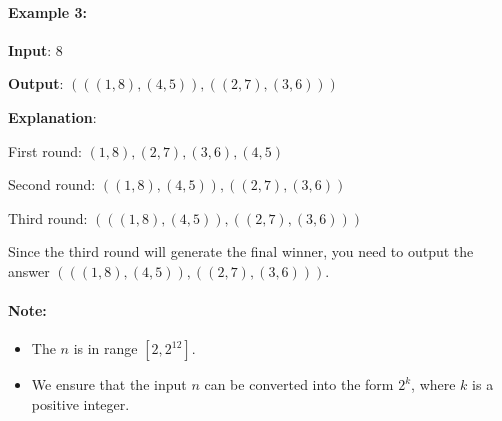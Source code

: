\paragraph{Example 3:}

\begin{flushleft}
\textbf{Input}: 8

\textbf{Output}: $(((1,8),(4,5)),((2,7),(3,6)))$

\textbf{Explanation}:
 
First round: $(1,8),(2,7),(3,6),(4,5)$

Second round: $((1,8),(4,5)),((2,7),(3,6))$

Third round: $(((1,8),(4,5)),((2,7),(3,6)))$

Since the third round will generate the final winner, you need to output the answer $(((1,8),(4,5)),((2,7),(3,6)))$.
\end{flushleft}

\paragraph{Note:}

\begin{itemize}
\item The $ n $ is in range $[2, 2^{12}]$.
\item We ensure that the input $ n $ can be converted into the form $2^k$, where $k$ is a positive integer.
\end{itemize}